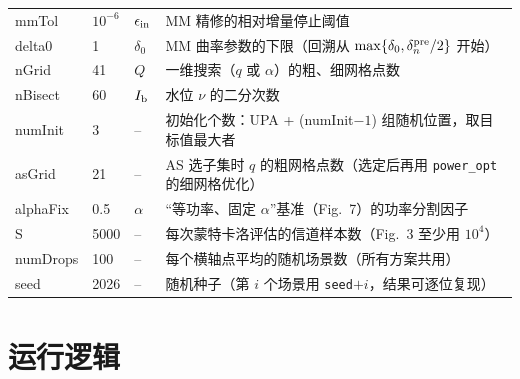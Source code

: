 \documentclass[11pt,a4paper]{ctexart}
\newcommand{\code}[1]{\texttt{#1}}
\begin{document}
\begin{longtable}{>{\ttfamily}p{2.5cm}p{1.6cm}p{2.0cm}p{8.9cm}}
mmTol & $10^{-6}$ & $\epsilon_{\rm in}$ & MM 精修的相对增量停止阈值 \\
delta0 & 1 & $\delta_0$ & MM 曲率参数的下限（回溯从 $\max\{\delta_0,\delta_n^{\rm pre}/2\}$ 开始）\\
nGrid & 41 & $Q$ & 一维搜索（$q$ 或 $\alpha$）的粗、细网格点数 \\
nBisect & 60 & $I_{\rm b}$ & 水位 $\nu$ 的二分次数 \\
numInit & 3 & -- & 初始化个数：UPA + (numInit$-1$) 组随机位置，取目标值最大者 \\
asGrid & 21 & -- & AS 选子集时 $q$ 的粗网格点数（选定后再用 \code{power\_opt} 的细网格优化）\\
alphaFix & 0.5 & $\alpha$ & “等功率、固定 $\alpha$”基准（Fig.~7）的功率分割因子 \\ \midrule
S & 5000 & -- & 每次蒙特卡洛评估的信道样本数（Fig.~3 至少用 $10^4$）\\
numDrops & 100 & -- & 每个横轴点平均的随机场景数（所有方案共用）\\
seed & 2026 & -- & 随机种子（第 $i$ 个场景用 \code{seed}$+i$，结果可逐位复现）\\
\bottomrule
\end{longtable}

\section{运行逻辑}
\end{document}
